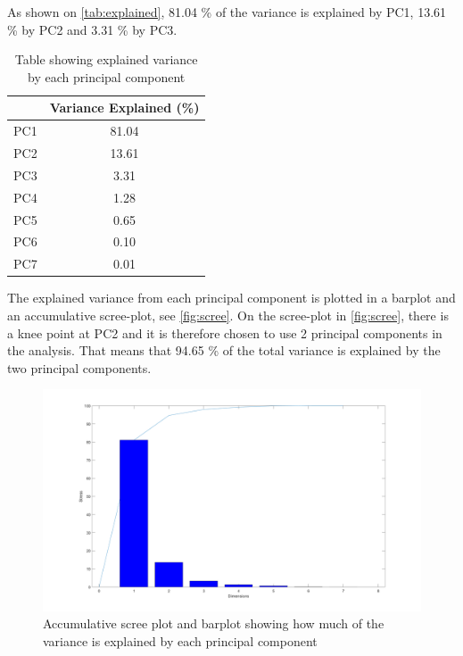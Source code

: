 As shown on \autoref{tab:explained}, 81.04 \% of the variance is explained by PC1, 13.61 \% by PC2 and 3.31 \% by PC3. 
\begin{table}[H]
\centering
\begin{tabular}{lc}
\hline
                         & \multicolumn{1}{l}{Variance Explained (\%)} \\ \hline
\multicolumn{1}{l|}{PC1} & 81.04                                       \\
\multicolumn{1}{l|}{PC2} & 13.61                                       \\
\multicolumn{1}{l|}{PC3} & 3.31                                        \\
\multicolumn{1}{l|}{PC4} & 1.28                                        \\
\multicolumn{1}{l|}{PC5} & 0.65                                        \\
\multicolumn{1}{l|}{PC6} & 0.10                                        \\
\multicolumn{1}{l|}{PC7} & 0.01                                       
\end{tabular}
\caption{Table showing explained variance by each principal component}
\label{tab:explained}
\end{table}


The explained variance from each principal component is plotted in a barplot and an accumulative scree-plot, see \autoref{fig:scree}. On the scree-plot in \autoref{fig:scree}, there is a knee point at PC2 and it is therefore chosen to use 2 principal components in the analysis. That means that 94.65 \% of the total variance is explained by the two principal components.
\begin{figure}[H]
\centering
\includegraphics[width =\textwidth]{Figure/Screeplot}
\caption{Accumulative scree plot and barplot showing how much of the variance is explained by each principal component}
\label{fig:scree}
\end{figure}
\noindent


